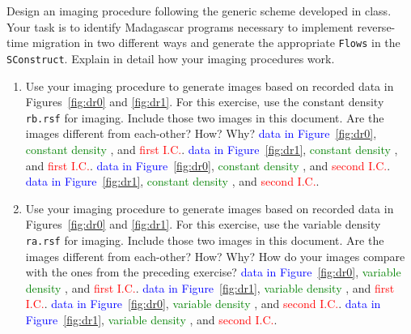 Design an imaging procedure following the generic scheme developed in
class. Your task is to identify Madagascar programs necessary to
implement reverse-time migration in two different ways and generate
the appropriate \texttt{Flows} in the \texttt{SConstruct}. Explain in
detail how your imaging procedures work. 

\begin{enumerate}
\item Use your imaging procedure to generate images based on recorded
  data in Figures~\ref{fig:dr0} and \ref{fig:dr1}. For this exercise,
  use the constant density \texttt{rb.rsf} for imaging. Include those
  two images in this document. Are the images different from
  each-other? How? Why?
{\textcolor{blue}{data in Figure~\ref{fig:dr0}}, \textcolor{green}{constant density }, 
and \textcolor{red}{ first I.C.}.}
{\textcolor{blue}{data in Figure~\ref{fig:dr1}}, \textcolor{green}{constant density }, 
and \textcolor{red}{ first I.C.}.}
{\textcolor{blue}{data in Figure~\ref{fig:dr0}}, \textcolor{green}{constant density }, 
and \textcolor{red}{ second I.C.}.}
{\textcolor{blue}{data in Figure~\ref{fig:dr1}}, \textcolor{green}{constant density }, 
and \textcolor{red}{ second I.C.}.}

\item Use your imaging procedure to generate images based on recorded
  data in Figures~\ref{fig:dr0} and \ref{fig:dr1}. For this exercise,
  use the variable density \texttt{ra.rsf} for imaging. Include those
  two images in this document. Are the images different from
  each-other? How? Why? How do your images compare with the ones from
  the preceding exercise?
{\textcolor{blue}{data in Figure~\ref{fig:dr0}}, \textcolor{green}{variable density }, 
and \textcolor{red}{first I.C.}.}
{\textcolor{blue}{data in Figure~\ref{fig:dr1}}, \textcolor{green}{variable density }, 
and \textcolor{red}{first I.C.}.}
{\textcolor{blue}{data in Figure~\ref{fig:dr0}}, \textcolor{green}{variable density }, 
and \textcolor{red}{second I.C.}.}
{\textcolor{blue}{data in Figure~\ref{fig:dr1}}, \textcolor{green}{variable density }, 
and \textcolor{red}{second I.C.}.}
\end{enumerate}
